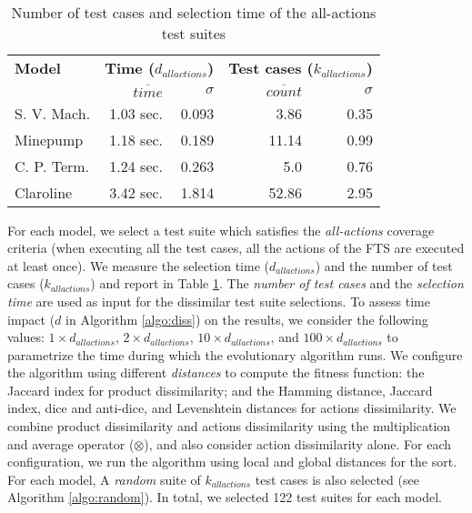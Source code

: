 \begin{table}
	\centering
	\caption{Number of test cases and selection time of the all-actions test suites}
	\begin{small}
	\begin{tabular}{lrrrr}
		\hline
		\textbf{Model}	& \multicolumn{2}{c}{\textbf{Time ($d_{allactions}$)}} 	& \multicolumn{2}{c}{\textbf{Test cases ($k_{allactions}$)}}\\
						& $\overline{time}$ & $\sigma$		& $\overline{count}$	& $\sigma$	\\
		\hline 
		S. V. Mach.		& 1.03 sec. & 0.093	& 3.86	& 0.35	\\
		Minepump			& 1.18 sec. & 0.189	& 11.14	& 0.99	\\
		C. P. Term.		& 1.24 sec.	& 0.263	& 5.0	& 0.76	\\
		Claroline		& 3.42 sec.	& 1.814	& 52.86	& 2.95	\\
		\hline
	\end{tabular}
	\end{small}
	\label{tab:allactions:exec}
\end{table} 

For each model, we select a test suite which satisfies the \emph{all-actions} coverage criteria (\ie when executing all the test cases, all the actions of the FTS are executed at least once). We measure the selection time ($d_{allactions}$) and the number of test cases ($k_{allactions}$) and report in Table \ref{tab:allactions:exec}. 
%
The \emph{number of test cases} and the \emph{selection time} are used as input for the dissimilar test suite selections. To assess time impact ($d$  in Algorithm \ref{algo:diss}) on the results, we consider the following values: $1 \times d_{allactions}$, $2 \times d_{allactions}$, $10 \times d_{allactions}$, and $100 \times d_{allactions}$ to parametrize the time during which the evolutionary algorithm runs. 
%
We configure the algorithm using different \emph{distances} to compute the fitness function: the Jaccard index for product dissimilarity; and the Hamming distance, Jaccard index, dice and anti-dice, and Levenshtein distances for actions dissimilarity. We combine product dissimilarity and actions dissimilarity using the multiplication and average operator ($\otimes$), and also consider action dissimilarity alone. For each configuration, we run the algorithm  using local and global distances for the sort.
%
For each model, A \emph{random} suite of $k_{allactions}$ test cases is also selected (see Algorithm \ref{algo:random}). In total, we selected 122 test suites for each model.


